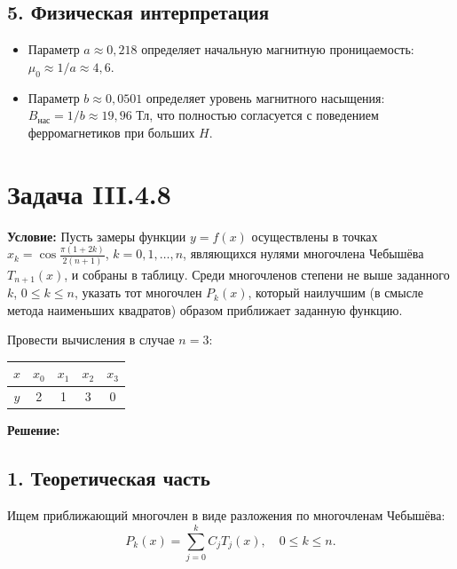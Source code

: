 \documentclass{article}
\begin{document}
\subsection*{5. Физическая интерпретация}
\begin{itemize}
    \item Параметр $a \approx 0{,}218$ определяет начальную магнитную проницаемость: $\mu_0 \approx 1/a \approx 4{,}6$.
    \item Параметр $b \approx 0{,}0501$ определяет уровень магнитного насыщения: $B_{\text{нас}} = 1/b \approx 19{,}96$ Тл, что полностью согласуется с поведением ферромагнетиков при больших $H$.
\end{itemize}



\section*{Задача III.4.8}

\textbf{Условие:} Пусть замеры функции $y = f(x)$ осуществлены в точках $x_k = \cos\frac{\pi(1+2k)}{2(n+1)}$, $k = 0, 1, \ldots, n$, являющихся нулями многочлена Чебышёва $T_{n+1}(x)$, и собраны в таблицу. Среди многочленов степени не выше заданного $k$, $0 \le k \le n$, указать тот многочлен $P_k(x)$, который наилучшим (в смысле метода наименьших квадратов) образом приближает заданную функцию.

Провести вычисления в случае $n = 3$:

\begin{center}
\begin{tabular}{|c|c|c|c|c|}
\hline
$x$ & $x_0$ & $x_1$ & $x_2$ & $x_3$ \\
\hline
$y$ & 2 & 1 & 3 & 0 \\
\hline
\end{tabular}
\end{center}

\vspace{0.5cm}
\textbf{Решение:}

\subsection*{1. Теоретическая часть}

Ищем приближающий многочлен в виде разложения по многочленам Чебышёва:
\begin{equation}
P_k(x) = \sum_{j=0}^{k} C_j T_j(x), \quad 0 \le k \le n.
\label{eq:48_pk}
\end{equation}
\end{document}
